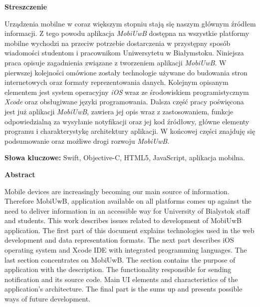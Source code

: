 \documentclass{iiuwb}
\begin{document}
\tableofcontents



\cleardoublepage
\lstlistoflistings

\listoffigures

\cleardoublepage

\begin{center}
\textbf{Streszczenie}
\end{center}

Urządzenia mobilne w coraz większym stopniu stają się naszym głównym źródłem informacji. Z tego powodu aplikacja \textit{MobiUwB} dostępna na wszystkie platformy mobilne wychodzi na przeciw potrzebie dostarczenia w przystępny sposób wiadomości studentom i pracownikom Uniwersytetu w Białymstoku. Niniejsza praca opisuje zagadnienia związane z tworzeniem aplikacji \textit{MobiUwB}. W pierwszej kolejności omówione zostały technologie używane do budowania stron internetowych oraz formaty reprezentowania danych. Kolejnym opisanym elementem jest system operacyjny \textit{iOS} wraz ze środowiskiem programistycznym \textit{Xcode} oraz obsługiwane języki programowania. Dalsza część pracy poświęcona jest już aplikacji \textit{MobiUwB}, zawiera jej opis wraz z zastosowaniem, funkcje odpowiedzialną za wysyłanie notyfikacji oraz jej kod źródłowy, główne elementy programu i charakterystykę architektury aplikacji. W końcowej części znajduję się podsumowanie oraz możliwe drogi rozwoju \textit{MobiUwB}.

\textbf{Słowa kluczowe:} Swift, Objective-C, HTML5, 	JavaScript, aplikacja mobilna.

\begin{center}
\textbf{Abstract}
\end{center}

Mobile devices are increasingly becoming our main source of information. Therefore MobiUwB, application  available on all platforms comes up against the need to deliver information in an accessible way for University of Bialystok staff and students. This work describes issues related to development of MobiUwB application. The first part of this document explains technologies used in the web development and data representation formats. The next part describes iOS operating system and  Xcode IDE with integrated programming languages. The last section concentrates on  MobiUwB. The section contains the purpose of application with the description. The functionality responsible for sending notification and its source code. Main UI elements and characteristics of the application's architecture. The final part is the sums up and presents possible ways of future development.
\end{document}

